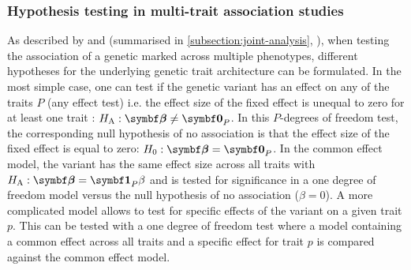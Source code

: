 \subsubsection{Hypothesis testing in multi-trait association studies}
\label{subsubsection:model-design}
As described by \citet{Jiang1995} and \citet{Korte2012} (summarised in \cref{subsection:joint-analysis}, ), when testing the association of a genetic marked across multiple phenotypes, different hypotheses for the underlying genetic trait architecture can be formulated. In the most simple case, one can test if the genetic variant has an effect on any of the traits \(P\) (any effect test) i.e. the effect size of the fixed effect \tmat{\beta} is unequal to zero for at least one trait : \(H_\text{A}: \mat{\beta} \ne \mat{0}_P\).  In this \(P\)-degrees of freedom test, the corresponding null hypothesis of no association is that the effect size of the fixed effect is equal to zero: \(H_0:\mat{\beta}  = \mat{0}_P\). In the common effect model, the variant has the same effect size across all traits with \(H_\text{A}: \mat{\beta}  = \mat{1}_P\beta\) and is tested for significance in a one degree of freedom model versus the null hypothesis of no association (\(\beta  = 0\)). A more complicated model allows to test for specific effects of the variant on a given trait \(p\). This can be tested with a one degree of freedom test where a model containing a common effect across all traits and a specific effect for trait \(p\) is compared against the common effect model.